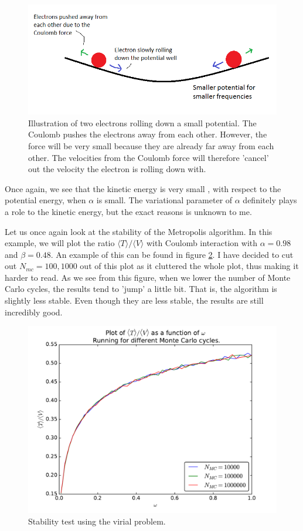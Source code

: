 \documentclass[12pt]{article}
\begin{document}
\begin{figure}[h]
\centering
\includegraphics[width=\linewidth]{Virial-example.png}
\caption{Illustration of two electrons rolling down a small potential. The Coulomb pushes the electrons away from each other. However, the force will be very small because they are already far away from each other. The velocities from the Coulomb force will therefore 'cancel' out the velocity the electron is rolling down with.}
\label{fig:Virial_Example}
\end{figure}

Once again, we see that the kinetic energy is very small , with respect to the potential energy, when $\alpha$ is small. The variational parameter of $\alpha$ definitely plays a role to the kinetic energy, but the exact reasons is unknown to me.

Let us once again look at the stability of the Metropolis algorithm. In this example, we will plot the ratio $\langle T \rangle / \langle V \rangle$ with Coulomb interaction with $\alpha = 0.98$ and $\beta = 0.48$. An example of this can be found in figure \ref{fig:Stability_virial}. I have decided to cut out $N_{mc} = 100, 1000$ out of this plot as it cluttered the whole plot, thus making it harder to read. As we see from this figure, when we lower the number of Monte Carlo cycles, the results tend to 'jump' a little bit. That is, the algorithm is slightly less stable. Even though they are less stable, the results are still incredibly good.
\begin{figure}[h]
\centering
\includegraphics[width=\linewidth]{Plots/Virial_stability_test.pdf}
\caption{Stability test using the virial problem.}
\label{fig:Stability_virial}
\end{figure}
\FloatBarrier
\end{document}

